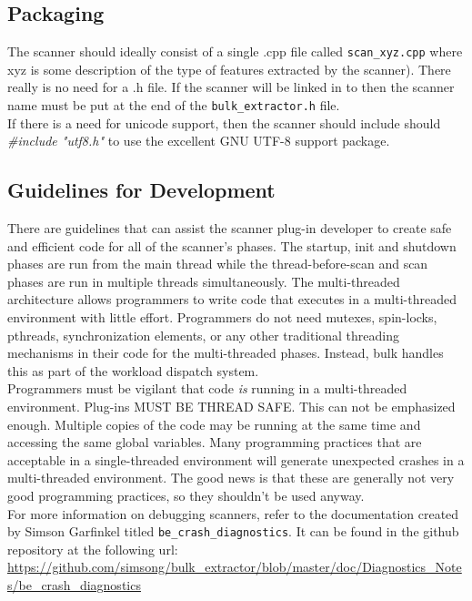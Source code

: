 \documentclass[11pt,fleqn]{article} %
\begin{document}
\subsection{Packaging}

The scanner should ideally consist of a single .cpp file called \texttt{scan\_xyz.cpp} where xyz is some description of the type of features extracted by the scanner). There really is no need for a .h file. If the
scanner will be linked in to \bulk then the scanner name must be put at the end of the \texttt{bulk\_extractor.h} file. \\

If there is a need for unicode support, then the scanner should include
should  \textit{\#include "utf8.h" }to use the excellent GNU UTF-8 support package.

\subsection{Guidelines for Development}
\label{GuidelinesforDevelopment}
There are guidelines that can assist the scanner plug-in developer to create safe and efficient code for all of the scanner's phases. The startup, init and shutdown phases are run from the main thread while the thread-before-scan and scan phases are run in multiple threads simultaneously. The multi-threaded \bulk architecture allows programmers to write code that executes in a multi-threaded environment with little effort. Programmers do not need mutexes, spin-locks, pthreads, synchronization elements, or any other traditional threading mechanisms in their code for the multi-threaded phases. Instead, bulk handles this as part of the workload dispatch system. \\ 

Programmers must be vigilant that code \emph{is} running in a multi-threaded environment. Plug-ins MUST BE THREAD SAFE. This can not be emphasized enough. Multiple copies of the code may be running at the same time and accessing the same global
variables. Many programming practices that are acceptable in a single-threaded environment will generate unexpected crashes in a multi-threaded environment. The good news is that these are generally not very good programming practices, so they shouldn't be used anyway. \\

For more information on debugging \bulk scanners, refer to the documentation created by Simson Garfinkel titled \texttt{be\_crash\_diagnostics}. It can be found in the github repository at the following url: \url{https://github.com/simsong/bulk_extractor/blob/master/doc/Diagnostics_Notes/be_crash_diagnostics} \\
\end{document}
